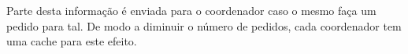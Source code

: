 \begin{description}
Parte desta informação é enviada para o coordenador caso o mesmo faça um pedido para tal. De modo a diminuir o número de pedidos, cada coordenador tem uma cache para este efeito.

\end{description}